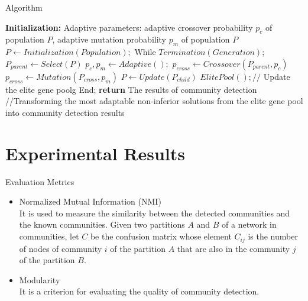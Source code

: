 \documentclass[aspectratio=169,xcolor=dvipsnames]{beamer}
\begin{document}

\begin{frame}{Algorithm}
    \begin{algorithm}[H]
        \begin{algorithmic}[1]
        \STATE \textbf{Initialization:} Adaptive parameters: adaptive crossover probability $p_{c}$ of
        population $P$, adaptive mutation probability $p_{m}$ of population $P$
        \STATE $P \leftarrow Initialization(Population);$
        \STATE While $Termination(Generation)$;
        \STATE $P_{parent} \leftarrow Select(P)$
        \STATE $p_{c}, p_{m} \leftarrow Adaptive();$
        \STATE $p_{cross} \leftarrow Crossover(P_{parent}, p_{c})$
        \STATE $p_{cross} \leftarrow Mutation(P_{cross}, p_{m})$
        \STATE $P \leftarrow Update(P_{child})$
        \STATE $ElitePool();//$ {Update the elite gene poolg}
        \STATE End;
        \STATE \textbf{return} The results of community detection //{Transforming the most adaptable non-inferior solutions from the elite gene pool into community detection results}
        \end{algorithmic}
        \caption{Framework of F-SGCD Algorithm}
        \label{alg:seq}
    \end{algorithm}
\end{frame}


\section{Experimental Results}

\begin{frame}{Evaluation Metrics}
    \begin{itemize}
        \item Normalized Mutual Information (NMI) \\
        It is used to measure the similarity between the detected communities and the known communities. Given two partitions $A$ and $B$ of a network in communities, let $C$ be the confusion matrix whose element $C_{ij}$ is the number of nodes of community $i$ of the partition $A$ that are also in the community $j$ of the partition $B$.
        \item Modularity \\
        It is a criterion for evaluating the quality of community detection.
    \end{itemize}
\end{frame}
\end{document}
